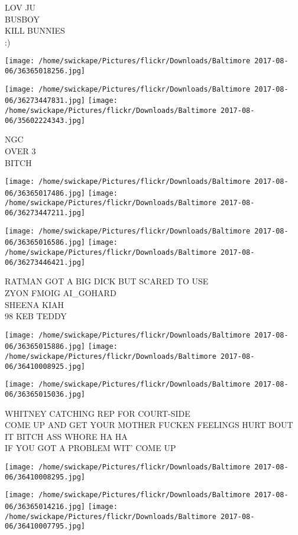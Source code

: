 \documentclass[10pt,letterpaper]{article}
\begin{document}
LOV JU\\
BUSBOY\\
KILL BUNNIES\\
:)
\pagebreak

\texttt{[image: /home/swickape/Pictures/flickr/Downloads/Baltimore 2017-08-06/36365018256.jpg]}

\vspace{0.25in}
\texttt{[image: /home/swickape/Pictures/flickr/Downloads/Baltimore 2017-08-06/36273447831.jpg]}
\texttt{[image: /home/swickape/Pictures/flickr/Downloads/Baltimore 2017-08-06/35602224343.jpg]}

NGC\\
OVER 3\\
BITCH
\pagebreak

\texttt{[image: /home/swickape/Pictures/flickr/Downloads/Baltimore 2017-08-06/36365017486.jpg]}
\texttt{[image: /home/swickape/Pictures/flickr/Downloads/Baltimore 2017-08-06/36273447211.jpg]}

\texttt{[image: /home/swickape/Pictures/flickr/Downloads/Baltimore 2017-08-06/36365016586.jpg]}
\texttt{[image: /home/swickape/Pictures/flickr/Downloads/Baltimore 2017-08-06/36273446421.jpg]}

RATMAN GOT A BIG DICK BUT SCARED TO USE\\
ZYON FMOIG AI\_GOHARD\\
SHEENA KIAH\\
98 KEB TEDDY
\pagebreak

\texttt{[image: /home/swickape/Pictures/flickr/Downloads/Baltimore 2017-08-06/36365015886.jpg]}
\texttt{[image: /home/swickape/Pictures/flickr/Downloads/Baltimore 2017-08-06/36410008925.jpg]}

\vspace{0.25in}
\texttt{[image: /home/swickape/Pictures/flickr/Downloads/Baltimore 2017-08-06/36365015036.jpg]}

WHITNEY CATCHING REP FOR COURT{-}SIDE\\
COME UP AND GET YOUR MOTHER FUCKEN FEELINGS HURT BOUT IT BITCH ASS WHORE HA HA\\
IF YOU GOT A PROBLEM WIT' COME UP
\pagebreak

\texttt{[image: /home/swickape/Pictures/flickr/Downloads/Baltimore 2017-08-06/36410008295.jpg]}

\vspace{0.25in}
\texttt{[image: /home/swickape/Pictures/flickr/Downloads/Baltimore 2017-08-06/36365014216.jpg]}
\texttt{[image: /home/swickape/Pictures/flickr/Downloads/Baltimore 2017-08-06/36410007795.jpg]}
\end{document}

